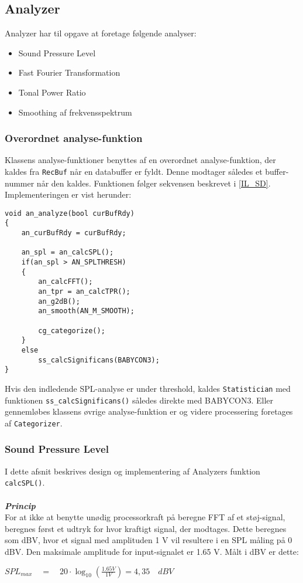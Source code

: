 \subsection*{Analyzer}
Analyzer har til opgave at foretage følgende analyser:
\begin{itemize}
	\item Sound Pressure Level
	\item Fast Fourier Transformation
	\item Tonal Power Ratio
	\item Smoothing af frekvensspektrum
\end{itemize}

\subsubsection{Overordnet analyse-funktion}
Klassens analyse-funktioner benyttes af en overordnet analyse-funktion, der kaldes fra \verb+RecBuf+ når en databuffer er fyldt. Denne modtager således et buffer-nummer når den kaldes. Funktionen følger sekvensen beskrevet i \ref{IL_SD}. Implementeringen er vist herunder:
\begin{verbatim}void an_analyze(bool curBufRdy)
{
    an_curBufRdy = curBufRdy;

    an_spl = an_calcSPL();
    if(an_spl > AN_SPLTHRESH)
    {
        an_calcFFT();			
        an_tpr = an_calcTPR();
        an_g2dB();
        an_smooth(AN_M_SMOOTH);

        cg_categorize();
    }
    else
        ss_calcSignificans(BABYCON3);
}\end{verbatim}
Hvis den indledende SPL-analyse er under threshold, kaldes \verb+Statistician+ med funktionen \verb+ss_calcSignificans()+ således direkte med BABYCON3. Eller gennemløbes klassens øvrige analyse-funktion er og videre processering foretages af \verb+Categorizer+.

\subsubsection{Sound Pressure Level} \label{an_spl}
I dette afsnit beskrives design og implementering af Analyzers funktion \verb+calcSPL()+.\\ \\
\textbf{\textit{Princip}}\\
For at ikke at benytte unødig processorkraft på beregne FFT af et støj-signal, beregnes først et udtryk for hvor kraftigt signal, der modtages. Dette beregnes som dBV, hvor et signal med amplituden 1 V vil resultere i en SPL måling på 0 dBV. Den maksimale amplitude for input-signalet er 1.65 V. Målt i dBV er dette:
\begin{center}
${ SPL }_{ max }\quad =\quad 20\cdot \log _{ 10 }{ \left( \frac { 1.65V }{ 1V }  \right)  } =4,35\quad dBV$
\end{center}

